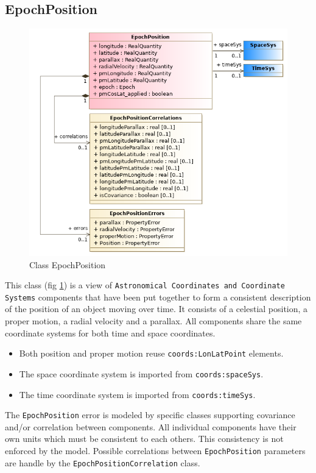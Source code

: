   \subsection{EpochPosition}
    \begin{figure}[h]
    \includegraphics[width=1.0\textwidth]{../model/EpochPosition.png}
    \caption{Class EpochPosition}
    \label{fig:EpochPosition}
    \end{figure}
    \label{sect:EpochPosition}
    This class (fig \ref{fig:EpochPosition}) is a view of \texttt{Astronomical Coordinates and Coordinate Systems} \citep{2022ivoa.specQ1004R} components that have been put together to form a consistent description of the position of an object moving over time. It consists of a celestial position, a proper motion, a radial velocity and a parallax. All components share the same coordinate systems for both time and space coordinates. \begin{itemize} \item Both position and proper motion reuse \texttt{coords:LonLatPoint} elements. \item The space coordinate system is imported from \texttt{coords:spaceSys}. \item The time coordinate system is imported from \texttt{coords:timeSys}. \end{itemize} The \texttt{EpochPosition} error is modeled by specific classes supporting covariance and/or correlation between components. All individual components have their own units which must be consistent to each others. This consistency is not enforced by the model. Possible correlations between \texttt{EpochPosition} parameters are handle by the \texttt{EpochPositionCorrelation} class.

